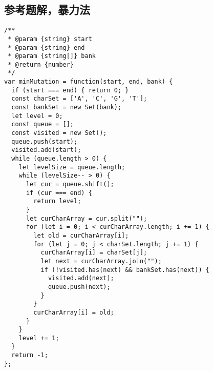 \subsection{参考题解，暴力法}

\begin{verbatim}
/**
 * @param {string} start
 * @param {string} end
 * @param {string[]} bank
 * @return {number}
 */
var minMutation = function(start, end, bank) {
  if (start === end) { return 0; }
  const charSet = ['A', 'C', 'G', 'T'];
  const bankSet = new Set(bank);
  let level = 0;
  const queue = [];
  const visited = new Set();
  queue.push(start);
  visited.add(start);
  while (queue.length > 0) {
    let levelSize = queue.length;
    while (levelSize-- > 0) {
      let cur = queue.shift();
      if (cur === end) {
        return level;
      }
      let curCharArray = cur.split("");
      for (let i = 0; i < curCharArray.length; i += 1) {
        let old = curCharArray[i];
        for (let j = 0; j < charSet.length; j += 1) {
          curCharArray[i] = charSet[j];
          let next = curCharArray.join("");
          if (!visited.has(next) && bankSet.has(next)) {
            visited.add(next);
            queue.push(next);
          }
        }
        curCharArray[i] = old;
      }
    }
    level += 1;
  }
  return -1;
};
\end{verbatim}

